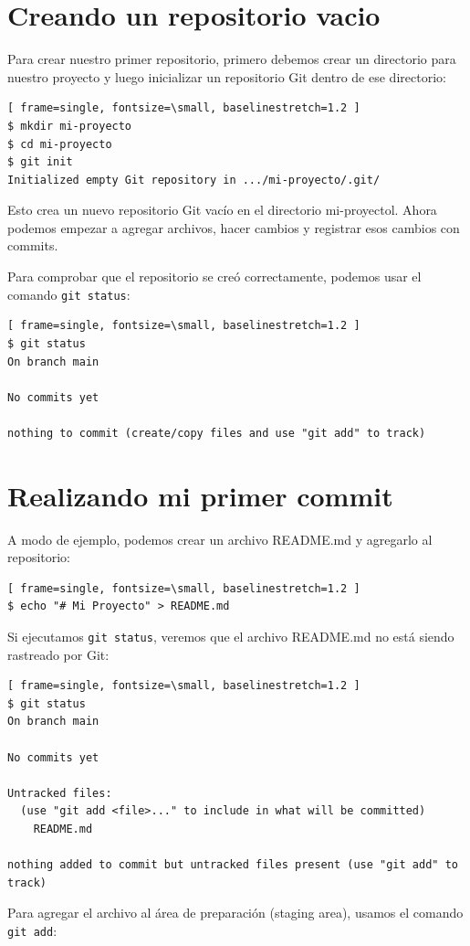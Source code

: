 \documentclass{apuntes_itsv}
\begin{document}
\section{Creando un repositorio vacio}
Para crear nuestro primer repositorio, primero debemos crear un directorio para nuestro proyecto y luego inicializar un
repositorio Git dentro de ese directorio:
\begin{Verbatim}[ frame=single, fontsize=\small, baselinestretch=1.2 ]
$ mkdir mi-proyecto
$ cd mi-proyecto
$ git init
Initialized empty Git repository in .../mi-proyecto/.git/
\end{Verbatim}
Esto crea un nuevo repositorio Git vacío en el directorio mi-proyectol. Ahora podemos empezar a agregar archivos,
hacer cambios y registrar esos cambios con commits.

Para comprobar que el repositorio se creó correctamente, podemos usar el comando \texttt{git status}:
\begin{Verbatim}[ frame=single, fontsize=\small, baselinestretch=1.2 ]
$ git status
On branch main

No commits yet

nothing to commit (create/copy files and use "git add" to track)
\end{Verbatim}

\section{Realizando mi primer commit}
A modo de ejemplo, podemos crear un archivo README.md y agregarlo al repositorio:
\begin{Verbatim}[ frame=single, fontsize=\small, baselinestretch=1.2 ]
$ echo "# Mi Proyecto" > README.md
\end{Verbatim}

Si ejecutamos \texttt{git status}, veremos que el archivo README.md no está siendo rastreado por Git:
\begin{Verbatim}[ frame=single, fontsize=\small, baselinestretch=1.2 ]
$ git status
On branch main

No commits yet

Untracked files:
  (use "git add <file>..." to include in what will be committed)
	README.md

nothing added to commit but untracked files present (use "git add" to track)
\end{Verbatim}

Para agregar el archivo al área de preparación (staging area), usamos el comando \texttt{git add}:
\end{document}
